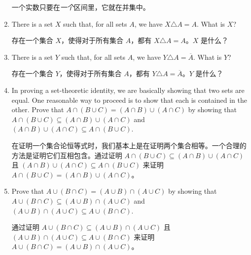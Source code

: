 \begin{enumerate}
{  一个实数只要在{\em 一个}区间里，它就在并集中。
  }
  
  \wbvfill
  
  \workbookpagebreak
  
  \item There is a set $X$ such that, for all sets $A$, we have 
  $X \triangle A = A$.
  What is $X$?
  
  存在一个集合 $X$，使得对于所有集合 $A$，都有 $X \triangle A = A$。$X$ 是什么？
  
  \wbvfill
  
  \item There is a set $Y$ such that, for all sets $A$, we have 
  $Y \triangle A = \overline{A}$.
  What is $Y$?
  
  存在一个集合 $Y$，使得对于所有集合 $A$，都有 $Y \triangle A = \overline{A}$。$Y$ 是什么？
  
  
  \wbvfill
  
  \workbookpagebreak
  
  \item In proving a set-theoretic identity, we are basically showing that
  two sets are equal.
  One reasonable way to proceed is to show that
  each is contained in the other.
  Prove that 
  $A \cap (B \cup C) = (A \cap B) \cup (A \cap C)$ by showing that 
  $A \cap (B \cup C) \subseteq (A \cap B) \cup (A \cap C)$ and 
  $(A \cap B) \cup (A \cap C) \subseteq A \cap (B \cup C)$.
  
  在证明一个集合论恒等式时，我们基本上是在证明两个集合相等。一个合理的方法是证明它们互相包含。通过证明 $A \cap (B \cup C) \subseteq (A \cap B) \cup (A \cap C)$ 且 $(A \cap B) \cup (A \cap C) \subseteq A \cap (B \cup C)$ 来证明 $A \cap (B \cup C) = (A \cap B) \cup (A \cap C)$。
  \wbvfill
  
  \workbookpagebreak
  
  \item Prove that 
  $A \cup (B \cap C) = (A \cup B) \cap (A \cup C)$ by showing that 
  $A \cup (B \cap C) \subseteq (A \cup B) \cap (A \cup C)$ and 
  $(A \cup B) \cap (A \cup C) \subseteq A \cup (B \cap C)$.
  
  通过证明 $A \cup (B \cap C) \subseteq (A \cup B) \cap (A \cup C)$ 且 $(A \cup B) \cap (A \cup C) \subseteq A \cup (B \cap C)$ 来证明 $A \cup (B \cap C) = (A \cup B) \cap (A \cup C)$。
\end{enumerate}
